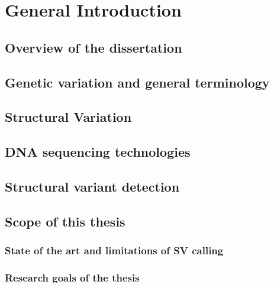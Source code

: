 \chapter{General Introduction}
\label{sec:intro}


\section{Overview of the dissertation}
\label{sec:overview}


\section{Genetic variation and general terminology}
\label{sec:variation}


\section{Structural Variation}
\label{sec:sv}



\section{DNA sequencing technologies}
\label{sec:sequencing}



\section{Structural variant detection}
\label{sec:sv_detection}



\section{Scope of this thesis}
\label{sec:motivation}


\subsection{State of the art and limitations of SV calling}

\subsection{Research goals of the thesis}



